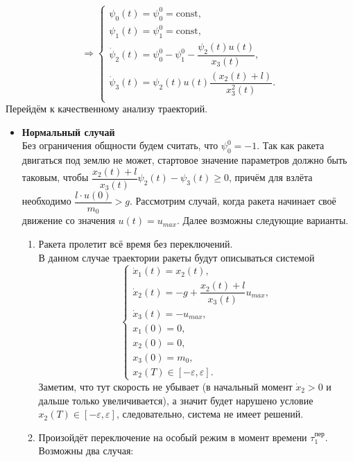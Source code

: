 \documentclass[a4paper,12pt]{article}
\begin{document}
$$ \Rightarrow \begin{cases}
	\psi_0(t) = \psi_0^0 = \mathrm{const}, \\
	\psi_1(t) = \psi_1^0 = \mathrm{const}, \\
	\dot{\psi}_2(t) = \psi_{0}^0 - \psi_{1}^0 - \dfrac{\psi_{2}(t)u(t)}{x_{3}(t)}, \\
	\dot{\psi}_3(t) = \psi_2(t)u(t) \dfrac{(x_2(t) + l)}{x_3^2(t)}. \\
\end{cases}$$
Перейдём к качественному анализу траекторий.
\begin{itemize}
\item \textbf{Нормальный случай} \\
Без ограничения общности будем считать, что $\psi_0^0 = -1$. Так как ракета двигаться под землю не может, стартовое значение параметров должно быть таковым, чтобы $\dfrac{x_2(t) + l}{x_3(t)}\psi_2(t) -  \psi_3(t) \geqslant 0$, причём для взлёта необходимо $\dfrac{l \cdot u(0)}{m_0} > g$. Рассмотрим случай, когда ракета начинает своё движение со значения $u(t) = u_{max}$. Далее возможны следующие варианты.
\begin{enumerate}
\item Ракета пролетит всё время без переключений. \\
В данном случае траектории ракеты будут описываться системой
$$\begin{cases}
	\dot{x}_1(t) = x_2(t), \\
	\dot{x}_2(t) = -g + \dfrac{x_2(t) + l}{x_3(t)}u_{max}, \\
	\dot{x}_3(t) = -u_{max}, \\
	x_1(0) = 0, \\ 
	x_2(0) = 0, \\
	x_3(0) = m_0, \\
	x_2(T) \in [-\varepsilon, \varepsilon]. 
\end{cases} $$
Заметим, что тут скорость не убывает (в начальный момент $\dot{x}_2 > 0$ и дальше только увеличивается), а значит будет нарушено условие $ x_2(T) \in [-\varepsilon, \varepsilon] $, следовательно, система не имеет решений.

\item Произойдёт переключение на особый режим в момент времени $\tau_1^{\text{пер}}$. \\
Возможны два случая: 


\end{enumerate}
\end{itemize}
\end{document}
